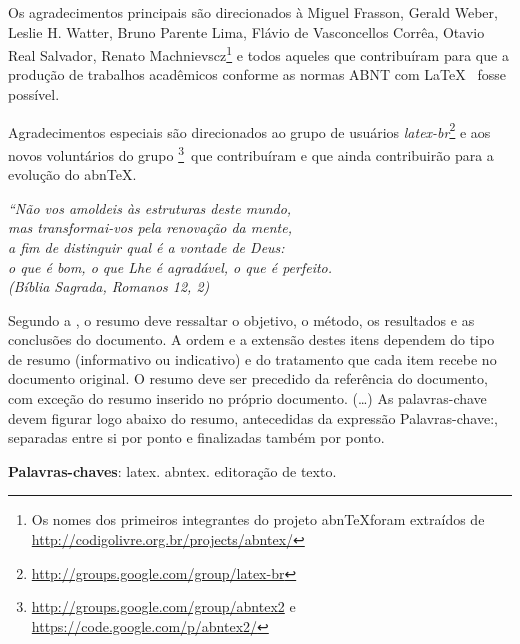 \documentclass[12pt,openright,twoside,a4paper]{abntex2}
\begin{document}
\begin{agradecimentos}
Os agradecimentos principais são direcionados à Miguel Frasson, Gerald Weber,
Leslie H. Watter, Bruno Parente Lima, Flávio de Vasconcellos Corrêa, Otavio Real
Salvador, Renato Machnievscz\footnote{Os nomes dos primeiros integrantes do
projeto abn\TeX foram extraídos de
\url{http://codigolivre.org.br/projects/abntex/}} e todos aqueles que
contribuíram para que a produção de trabalhos acadêmicos conforme
as normas ABNT com \LaTeX~ fosse possível.

Agradecimentos especiais são direcionados ao grupo de usuários
\emph{latex-br}\footnote{\url{http://groups.google.com/group/latex-br}} e aos
novos voluntários do grupo \emph{\abnTeX}
\footnote{\url{http://groups.google.com/group/abntex2} e
\url{https://code.google.com/p/abntex2/}}~que contribuíram e que ainda
contribuirão para a evolução do abn\TeX.
\end{agradecimentos}

\begin{epigrafe}
    \vspace*{\fill}
	\begin{flushright}
		\textit{``Não vos amoldeis às estruturas deste mundo, \\
		mas transformai-vos pela renovação da mente, \\
		a fim de distinguir qual é a vontade de Deus: \\
		o que é bom, o que Lhe é agradável, o que é perfeito.\\
		(Bíblia Sagrada, Romanos 12, 2)}
	\end{flushright}
\end{epigrafe}


\begin{resumo}
 Segundo a , o resumo deve ressaltar o
 objetivo, o método, os resultados e as conclusões do documento. A ordem e a extensão
 destes itens dependem do tipo de resumo (informativo ou indicativo) e do
 tratamento que cada item recebe no documento original. O resumo deve ser
 precedido da referência do documento, com exceção do resumo inserido no
 próprio documento. (\ldots) As palavras-chave devem figurar logo abaixo do
 resumo, antecedidas da expressão Palavras-chave:, separadas entre si por
 ponto e finalizadas também por ponto.

 \vspace{\onelineskip}
    
 \noindent
 \textbf{Palavras-chaves}: latex. abntex. editoração de texto.
\end{resumo}
\end{document}
